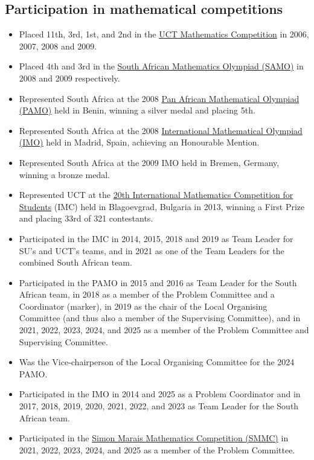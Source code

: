 \documentclass{article}
\begin{document}
\subsection{Participation in mathematical competitions}
\begin{itemize}
	\item Placed 11th, 3rd, 1st, and 2nd in the \href{http://www.mth.uct.ac.za/competition/}{UCT Mathematics Competition} in 2006, 2007, 2008 and 2009.
	\item Placed 4th and 3rd in the \href{http://www.samf.ac.za/sa-mathematics-olympiad}{South African Mathematics Olympiad (SAMO)} in 2008 and 2009 respectively.
	\item Represented South Africa at the 2008 \href{https://www.africamathunion.org/AMU-pamo-official.php}{Pan African Mathematical Olympiad (PAMO)} held in Benin, winning a silver medal and placing 5th.
	\item Represented South Africa at the 2008 \href{http://imo-official.org/}{International Mathematical Olympiad (IMO)} held in Madrid, Spain, achieving an Honourable Mention.
	\item Represented South Africa at the 2009 IMO held in Bremen, Germany, winning a bronze medal.
	\item Represented UCT at the \href{http://www.imc-math.org.uk/index.php?year=2013}{20th International Mathematics Competition for Students} (IMC) held in Blagoevgrad, Bulgaria in 2013, winning a First Prize and placing 33rd of 321 contestants.
	\item Participated in the IMC in 2014, 2015, 2018 and 2019 as Team Leader for SU's and UCT's teams, and in 2021 as one of the Team Leaders for the combined South African team.
	\item Participated in the PAMO in 2015 and 2016 as Team Leader for the South African team, in 2018 as a member of the Problem Committee and a Coordinator (marker), in 2019 as the chair of the Local Organising Committee (and thus also a member of the Supervising Committee), and in 2021, 2022, 2023, 2024, and 2025 as a member of the Problem Committee and Supervising Committee.
	\item Was the Vice-chairperson of the Local Organising Committee for the 2024 PAMO.
	\item Participated in the IMO in 2014 and 2025 as a Problem Coordinator and in 2017, 2018, 2019, 2020, 2021, 2022, and 2023 as Team Leader for the South African team.
	\item Participated in the \href{http://www.simonmarais.org/}{Simon Marais Mathematics Competition (SMMC)} in 2021, 2022, 2023, 2024, and 2025 as a member of the Problem Committee.
\end{itemize}
\end{document}
